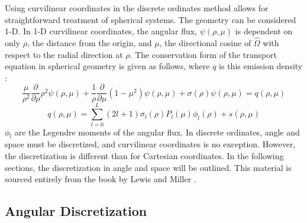 \documentclass[11pt, oneside]{article}   	%
\begin{document}
Using curvilinear coordinates in the discrete ordinates method allows for straightforward treatment of spherical systems. The geometry can be considered 1-D. In 1-D curvilinear coordinates, the angular flux, $\psi(\rho, \mu)$ is dependent on only $\rho$, the distance from the origin, and $\mu$, the directional cosine of $\hat{\Omega}$ with respect to the radial direction at $\rho$. The conservation form of the transport equation in spherical geometry is given as follows, where $q$ is this emission density \cite{lm}:
\newline
\begin{equation}\label{eq:conste}
	\frac{\mu}{\rho^2}\frac{\partial}{\partial\rho}\rho^2\psi(\rho, \mu)+
	\frac{1}{\rho}\frac{\partial}{\partial\mu}(1-\mu^2)\psi(\rho, \mu)+
	\sigma(\rho)\psi(\rho, \mu) = 
	q(\rho, \mu)
\end{equation}
\begin{equation}
q(\rho, \mu) = \sum_{l=0}^{L}(2l+1)\sigma_l(\rho)P_l(\mu)\phi_l(\rho)+s(\rho, \mu)
\end{equation}
\newline
$\phi_l$ are the Legendre moments of the angular flux. In discrete ordinates, angle and space must be discretized, and curvilinear coordinates is no exception. However, the discretization is different than for Cartesian coordinates. In the following sections, the discretization in angle and space will be outlined. This material is sourced entirely from the book by Lewis and Miller \cite{lm}.

\subsection{Angular Discretization}
\end{document}
